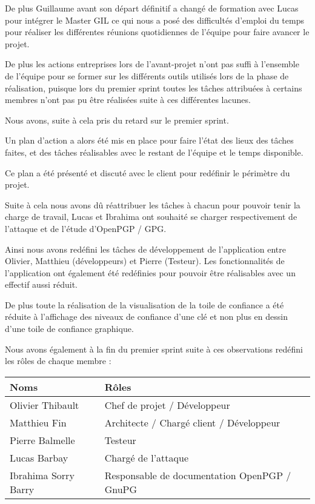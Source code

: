 \documentclass{../res/univ-projet}
\begin{document}
    De plus Guillaume avant son départ définitif a changé de formation avec Lucas pour intégrer le Master GIL
    ce qui nous a posé des difficultés d'emploi du temps pour réaliser les différentes réunions quotidiennes
    de l'équipe pour faire avancer le projet.

    De plus les actions entreprises lors de l'avant-projet n'ont pas suffi à l'ensemble de l'équipe 
    pour se former sur les différents outils utilisés lors de la phase de réalisation,
    puisque lors du premier sprint toutes les tâches attribuées à certains membres n'ont pas pu être
    réalisées suite à ces différentes lacunes.

    Nous avons, suite à cela pris du retard sur le premier sprint.

    Un plan d'action a alors été mis en place pour faire l'état des lieux des tâches
    faites, et des tâches réalisables avec le restant de l'équipe et le temps disponible.

    Ce plan a été présenté et discuté avec le client pour redéfinir le périmètre du projet.

    Suite à cela nous avons dû réattribuer les tâches à chacun pour pouvoir tenir la charge de travail,
    Lucas et Ibrahima ont souhaité se charger respectivement de l'attaque et de l'étude d'OpenPGP / GPG.

    Ainsi nous avons redéfini les tâches de développement de l'application
    entre Olivier, Matthieu (développeurs) et Pierre (Testeur).
    Les fonctionnalités de l'application ont également été redéfinies pour pouvoir être réalisables avec un effectif
    aussi réduit.

    De plus toute la réalisation de la visualisation de la toile de confiance a été réduite
    à l'affichage des niveaux de confiance d'une clé et non plus en dessin d'une toile de confiance graphique.

    Nous avons également à la fin du premier sprint suite à ces observations redéfini les rôles de chaque membre : 

    \begin{tabular}{|l|l|}
      \hline
      \bfseries{Noms}      & \bfseries{Rôles}                             \\
      \hline
      Olivier Thibault     & Chef de projet / Développeur                 \\
      Matthieu Fin         & Architecte / Chargé client / Développeur     \\
      Pierre Balmelle      & Testeur                                      \\
      Lucas Barbay         & Chargé de l'attaque                          \\
      Ibrahima Sorry Barry & Responsable de documentation OpenPGP / GnuPG \\
      \hline

    \end{tabular}
\end{document}
